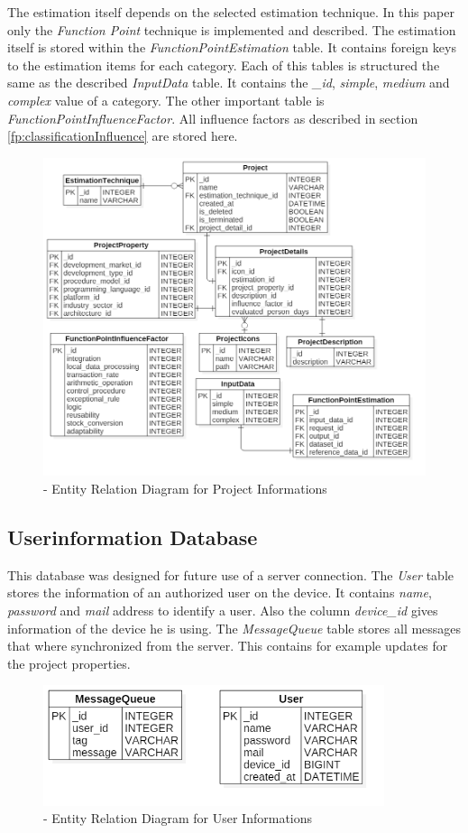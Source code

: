 The estimation itself depends on the selected estimation technique. In this paper only the \textit{Function Point} technique is implemented and described. The estimation itself is stored within the \textit{FunctionPointEstimation} table. It contains foreign keys to the estimation items for each category. Each of this tables is structured the same as the described \textit{InputData} table. It contains the \textit{\_id}, \textit{simple}, \textit{medium} and \textit{complex} value of a category. The other important table is \textit{FunctionPointInfluenceFactor}. All influence factors as described in section \ref{fp:classificationInfluence} are stored here.
\begin{figure}[h] 
	\centering 
	\includegraphics[width=13cm]{images/projectDiagramm.png} 
	\caption{- Entity Relation Diagram  for Project Informations} 
	\label{fig:projectER}
\end{figure}

\subsection{Userinformation Database}

This database was designed for future use of a server connection. The \textit{User} table stores the information of an authorized user on the device. It contains \textit{name}, \textit{password} and \textit{mail} address to identify a user. Also the column \textit{device\_id} gives information of the device he is using. The \textit{MessageQueue} table stores all messages that where synchronized from the server. This contains for example updates for the project properties.
\begin{figure}[h] 
	\centering 
	\includegraphics[width=10cm]{images/userDBDiagramm.png} 
	\caption{- Entity Relation Diagram  for User Informations} 
	\label{fig:userER}
\end{figure}

